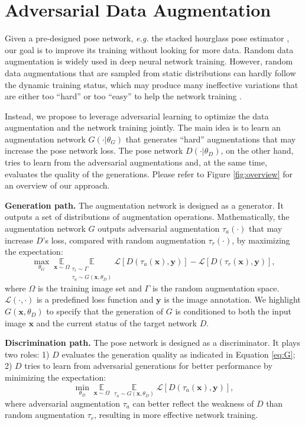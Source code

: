 \documentclass[10pt,twocolumn,letterpaper]{article}
\begin{document}
\section{Adversarial Data Augmentation}\label{sec:ada}
Given a pre-designed pose network, {\it e.g.} the stacked hourglass pose estimator \cite{newell2016stacked}, our goal is to improve its training without looking for more data. Random data augmentation is widely used in deep neural network training. However, random data augmentations that are sampled from static distributions can hardly follow the dynamic training status, which may produce many ineffective variations that are either too ``hard'' or too ``easy'' to help the network training \cite{shrivastava2016training,wang2017fast}.

Instead, we propose to leverage adversarial learning to optimize the data augmentation and the network training jointly. The main idea is to learn an augmentation network $G(\cdot|\theta_G)$ that generates ``hard'' augmentations that may increase the pose network loss. The pose network $D(\cdot|\theta_D)$, on the other hand, tries to learn from the adversarial augmentations and, at the same time, evaluates the quality of the generations. Please refer to Figure \ref{fig:overview} for an overview of our approach.

{\bf Generation path.} The augmentation network is designed as a generator. It outputs a set of distributions of augmentation operations. Mathematically, the augmentation network $G$ outputs adversarial augmentation $\tau_{a}(\cdot)$ that may increase $D$'s loss, compared with random augmentation $\tau_{r}(\cdot)$, by maximizing the expectation:
\begin{equation}
\label{eq:G}
\max_{\theta_{G}} \; \underset{\mathbf{x}\sim\Omega}{\mathbb{E}}
\underset{ \substack{\tau_{r}\sim{\Gamma} \\  \tau_{a}\sim{G(\mathbf{x},\theta_D)}} }{\mathbb{E}}
\mathcal{L}[D(\tau_{a}(\mathbf{x}), \mathbf{y})] - \mathcal{L}[D(\tau_{r}(\mathbf{x}), \mathbf{y})],
\end{equation}
where $\Omega$ is the training image set and $\Gamma$ is the random augmentation space. $\mathcal{L}(\cdot,\cdot)$ is a predefined loss function and $\mathbf{y}$ is the image annotation. We highlight $G(\mathbf{x},\theta_D)$ to specify that the generation of $G$ is conditioned to both the input image $\mathbf{x}$ and the current status of the target network $D$.

{\bf Discrimination path.} The pose network is designed as a discriminator. It plays two roles: 1) $D$ evaluates the generation quality as indicated in Equation \eqref{eq:G}; 2) $D$ tries to learn from adversarial generations for better performance by minimizing the expectation:
\begin{equation}
\label{eq:D}
\min_{\theta_{D}} \; \underset{\mathbf{x}\sim\Omega}{\mathbb{E}} \; \;
\underset{ \tau_{a}\sim{G(\mathbf{x},\theta_D)} }{\mathbb{E}} \;
\mathcal{L}[D(\tau_{a}(\mathbf{x}), \mathbf{y})],
\end{equation}
where adversarial augmentation $\tau_{a}$ can better reflect the weakness of $D$ than random augmentation $\tau_{r}$, resulting in more effective network training.
\end{document}
